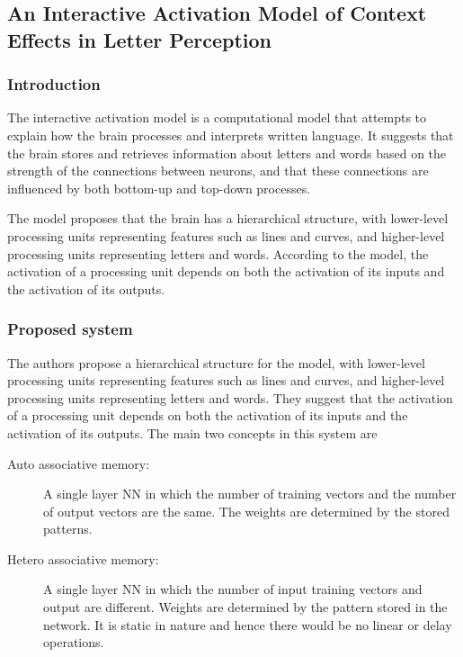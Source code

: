 \subsection{An Interactive Activation Model of Context Effects in Letter Perception}
\subsubsection{Introduction}
The interactive activation model\cite{auto} is a computational model that
attempts to explain how the brain processes and interprets written language. It
suggests that the brain stores and retrieves information about letters and
words based on the strength of the connections between neurons, and that these
connections are influenced by both bottom-up and top-down processes.

The model proposes that the brain has a hierarchical structure, with
lower-level processing units representing features such as lines and curves,
and higher-level processing units representing letters and words. According to
the model, the activation of a processing unit depends on both the activation
of its inputs and the activation of its outputs.
\subsubsection{Proposed system}
The authors propose a hierarchical structure for the model, with lower-level
processing units representing features such as lines and curves, and
higher-level processing units representing letters and words. They suggest that
the activation of a processing unit depends on both the activation of its
inputs and the activation of its outputs. The main two concepts in this system
are

\begin{description}
    \item[Auto associative memory:]A single layer NN in which the number of training
    vectors and the number of output vectors are the same. The weights are
    determined by the stored patterns.
    \item[Hetero associative memory:]A single layer NN in which the number of input
    training vectors and output are different. Weights are determined by the
    pattern stored in the network. It is static in nature and hence there would be
    no linear or delay operations.
\end{description}
